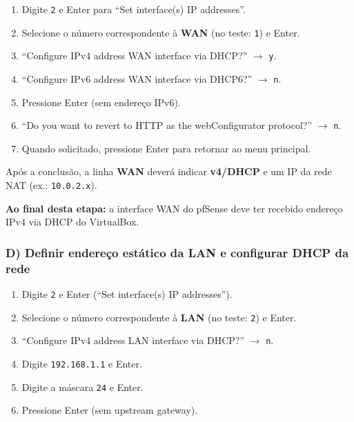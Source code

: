 \begin{enumerate}
  \item Digite \texttt{2} e Enter para ``Set interface(s) IP addresses''.
  \item Selecione o número correspondente à \textbf{WAN} (no teste: \texttt{1}) e Enter.
  \item ``Configure IPv4 address WAN interface via DHCP?'' $\rightarrow$ \texttt{y}.
  \item ``Configure IPv6 address WAN interface via DHCP6?'' $\rightarrow$ \texttt{n}.
  \item Pressione Enter (sem endereço IPv6).
  \item ``Do you want to revert to HTTP as the webConfigurator protocol?'' $\rightarrow$ \texttt{n}.
\end{enumerate}


\begin{enumerate}\setcounter{enumi}{6}
  \item Quando solicitado, pressione Enter para retornar ao menu principal.
\end{enumerate}

Após a conclusão, a linha \textbf{WAN} deverá indicar \textbf{v4/DHCP} e um IP da rede NAT (ex.: \texttt{10.0.2.x}).


\begin{notebox}
\textbf{Ao final desta etapa:} a interface WAN do pfSense deve ter recebido endereço IPv4 via DHCP do VirtualBox.
\end{notebox}

\subsubsection*{D) Definir endereço estático da LAN e configurar DHCP da rede}

\begin{enumerate}
  \item Digite \texttt{2} e Enter (``Set interface(s) IP addresses'').
  \item Selecione o número correspondente à \textbf{LAN} (no teste: \texttt{2}) e Enter.
  \item ``Configure IPv4 address LAN interface via DHCP?'' $\rightarrow$ \texttt{n}.
  \item Digite \texttt{192.168.1.1} e Enter.
  \item Digite a máscara \texttt{24} e Enter.
  \item Pressione Enter (sem upstream gateway).
\end{enumerate}

